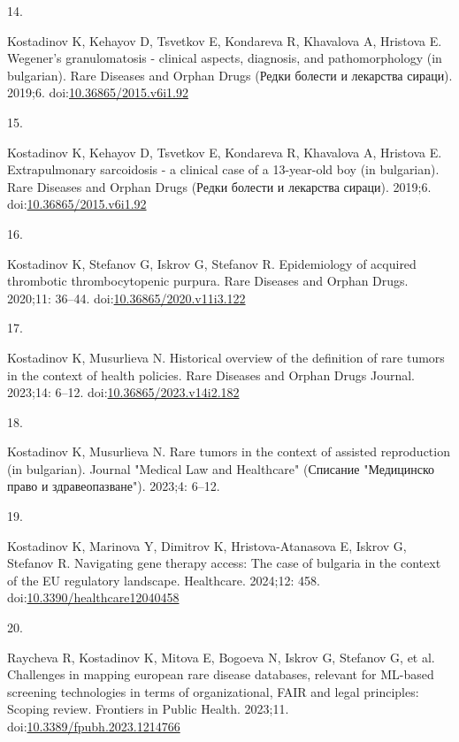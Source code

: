 \documentclass[
  12pt,
  letterpaper,
  DIV=11,
  numbers=noendperiod]{scrartcl}
\newlength{\cslhangindent}
\newlength{\csllabelwidth}
\newenvironment{CSLReferences}[2] %
 {\begin{list}{}{%
  \setlength{\itemindent}{0pt}
  \setlength{\leftmargin}{0pt}
  \setlength{\parsep}{0pt}
  \ifodd #1
   \setlength{\leftmargin}{\cslhangindent}
   \setlength{\itemindent}{-1\cslhangindent}
  \fi
  \setlength{\itemsep}{#2\baselineskip}}}
 {\end{list}}
\newcommand{\CSLLeftMargin}[1]{\parbox[t]{\csllabelwidth}{\strut#1\strut}}
\newcommand{\CSLRightInline}[1]{\parbox[t]{\linewidth - \csllabelwidth}{\strut#1\strut}}
\begin{document}
\begin{CSLReferences}{0}{1}
\CSLLeftMargin{14. }%
\CSLRightInline{Kostadinov K, Kehayov D, Tsvetkov E, Kondareva R,
Khavalova A, Hristova E. Wegener's granulomatosis - clinical aspects,
diagnosis, and pathomorphology (in bulgarian). Rare Diseases and Orphan
Drugs (Редки болести и лекарства сираци). 2019;6.
doi:\href{https://doi.org/10.36865/2015.v6i1.92}{10.36865/2015.v6i1.92}}

\CSLLeftMargin{15. }%
\CSLRightInline{Kostadinov K, Kehayov D, Tsvetkov E, Kondareva R,
Khavalova A, Hristova E. Extrapulmonary sarcoidosis - a clinical case of
a 13-year-old boy (in bulgarian). Rare Diseases and Orphan Drugs (Редки
болести и лекарства сираци). 2019;6.
doi:\href{https://doi.org/10.36865/2015.v6i1.92}{10.36865/2015.v6i1.92}}

\CSLLeftMargin{16. }%
\CSLRightInline{Kostadinov K, Stefanov G, Iskrov G, Stefanov R.
Epidemiology of acquired thrombotic thrombocytopenic purpura. Rare
Diseases and Orphan Drugs. 2020;11: 36--44.
doi:\href{https://doi.org/10.36865/2020.v11i3.122}{10.36865/2020.v11i3.122}}

\CSLLeftMargin{17. }%
\CSLRightInline{Kostadinov K, Musurlieva N. Historical overview of the
definition of rare tumors in the context of health policies. Rare
Diseases and Orphan Drugs Journal. 2023;14: 6--12.
doi:\href{https://doi.org/10.36865/2023.v14i2.182}{10.36865/2023.v14i2.182}}

\CSLLeftMargin{18. }%
\CSLRightInline{Kostadinov K, Musurlieva N. Rare tumors in the context
of assisted reproduction (in bulgarian). Journal "Medical Law and
Healthcare" (Списание "Медицинско право и здравеопазване"). 2023;4:
6--12. }

\CSLLeftMargin{19. }%
\CSLRightInline{Kostadinov K, Marinova Y, Dimitrov K, Hristova-Atanasova
E, Iskrov G, Stefanov R. Navigating gene therapy access: The case of
bulgaria in the context of the EU regulatory landscape. Healthcare.
2024;12: 458.
doi:\href{https://doi.org/10.3390/healthcare12040458}{10.3390/healthcare12040458}}

\CSLLeftMargin{20. }%
\CSLRightInline{Raycheva R, Kostadinov K, Mitova E, Bogoeva N, Iskrov G,
Stefanov G, et al. Challenges in mapping european rare disease
databases, relevant for ML-based screening technologies in terms of
organizational, FAIR and legal principles: Scoping review. Frontiers in
Public Health. 2023;11.
doi:\href{https://doi.org/10.3389/fpubh.2023.1214766}{10.3389/fpubh.2023.1214766}}


\end{CSLReferences}
\end{document}

